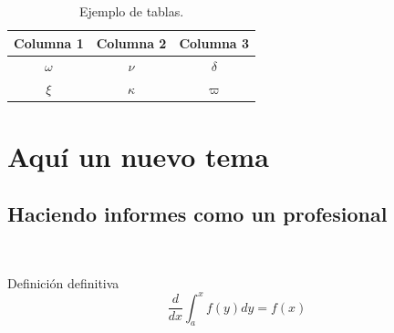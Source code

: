 	\begin{table}[H]
		\centering
		\caption{Ejemplo de tablas.}
		\begin{tabular}{ccc}
			\hline
			\textbf{Columna 1} & \textbf{Columna 2} & \textbf{Columna 3} \bigstrut\\
			\hline
			$\omega$ & $\nu$ & $\delta$ \bigstrut[t]\\
			$\xi$ & $\kappa$ & $\varpi$ \bigstrut[b] \\
			\hline
		\end{tabular}
		\label{tab:tabla-1}
	\end{table}


\clearpage
\section{Aquí un nuevo tema}

\subsection{Haciendo informes como un profesional}


	~ \lipsum[1] \\

	\lipsum[115]


	\begin{defn}
		Definición definitiva
		$$\frac{d}{dx}\int_a^xf(y)dy=f(x)$$
	\end{defn}

